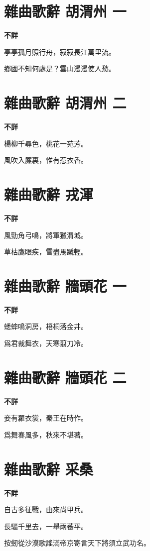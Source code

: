 \documentclass[12pt,a4paper]{ctexbook}
\begin{document}
\section{雜曲歌辭 胡渭州 一}
\textbf{不詳}\par\vspace{0.5em}
亭亭孤月照行舟，寂寂長江萬里流。\par
鄉國不知何處是？雲山漫漫使人愁。\par

\section{雜曲歌辭 胡渭州 二}
\textbf{不詳}\par\vspace{0.5em}
楊柳千尋色，桃花一苑芳。\par
風吹入簾裏，惟有惹衣香。\par

\section{雜曲歌辭 戎渾}
\textbf{不詳}\par\vspace{0.5em}
風勁角弓鳴，將軍獵渭城。\par
草枯鷹眼疾，雪盡馬蹏輕。\par

\section{雜曲歌辭 牆頭花 一}
\textbf{不詳}\par\vspace{0.5em}
蟋蟀鳴洞房，梧桐落金井。\par
爲君裁舞衣，天寒翦刀冷。\par

\section{雜曲歌辭 牆頭花 二}
\textbf{不詳}\par\vspace{0.5em}
妾有羅衣裳，秦王在時作。\par
爲舞春風多，秋來不堪著。\par

\section{雜曲歌辭 采桑}
\textbf{不詳}\par\vspace{0.5em}
自古多征戰，由來尚甲兵。\par
長驅千里去，一舉兩蕃平。\par
按劒從沙漠歌謠滿帝京寄言天下將須立武功名。\par
\end{document}
